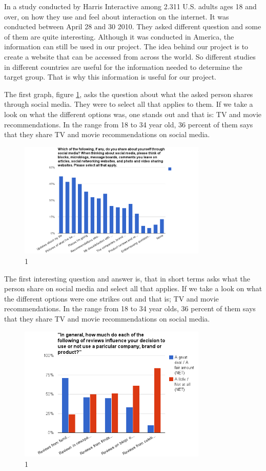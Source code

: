In a study conducted by Harris Interactive \cite{Harris} among 2.311 U.S. adults ages 18 and over, on how they use and feel about interaction on the internet. It was conducted between April 28 and 30 2010. They asked different question and some of them are quite interesting.
Although it was conducted in America, the information can still be used in our project. The idea behind our project is to create a website that can be accessed from across the world. So different studies in different countries are useful for the information needed to determine the target group. That is why this information is useful for our project.

The first graph, figure \ref{Teori1}, asks the question about what the asked person shares through social media. They were to select all that applies to them. If we take a look on what the different options was, one stands out and that is: TV and movie recommendations. In the range from 18 to 34 year old, 36 percent of them says that they share TV and movie recommendations on social media.

\begin{figure}[htb]
\centering
\includegraphics[width=0.8\textwidth]{Images/teori1.png}
\caption{1}
\label{Teori1}
\end{figure}

The first interesting question and answer is, that in short terms asks what the person share on social media and select all that applies. If we take a look on what the different options were one strikes out and that is; TV and movie recommendations. In the range from 18 to 34 year olds, 36 percent of them says that they share TV and movie recommendations on social media.

\begin{figure}[htb]
\centering
\includegraphics[width=0.8\textwidth]{Images/teori2.png}
\caption{1}
\label{Teori2}
\end{figure}

